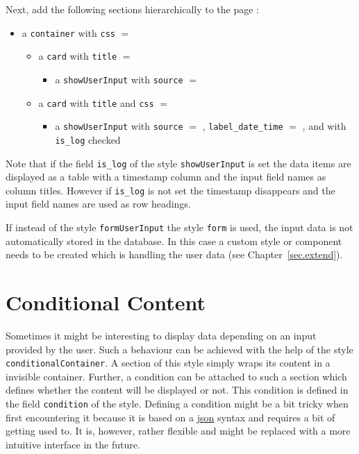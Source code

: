 \documentclass[a4paper,oneside]{book}
\begin{document}
Next, add the following sections hierarchically to the page :
\begin{itemize}
    \item a \texttt{container} with \texttt{css} $=$ 
        \begin{itemize}
            \item a \texttt{card} with \texttt{title} $=$ 
                \begin{itemize}
                    \item a \texttt{showUserInput} with \texttt{source} $=$ 
                \end{itemize}
            \item a \texttt{card} with \texttt{title}  and \texttt{css} $=$ 
                \begin{itemize}
                    \item a \texttt{showUserInput} with \texttt{source} $=$ , \texttt{label\_date\_time} $=$ , and with \texttt{is\_log} checked
                \end{itemize}
        \end{itemize}
\end{itemize}

Note that if the field \texttt{is\_log} of the style \texttt{showUserInput} is set the data items are displayed as a table with a timestamp column and the input field names as column titles.
However if \texttt{is\_log} is not set the timestamp disappears and the input field names are used as row headings.

If instead of the style \texttt{formUserInput} the style \texttt{form} is used, the input data is not automatically stored in the database.
In this case a custom style or component needs to be created which is handling the user data (see Chapter~\ref{sec.extend}).

\section{Conditional Content}
Sometimes it might be interesting to display data depending on an input provided by the user.
Such a behaviour can be achieved with the help of the style \texttt{conditionalContainer}.
A section of this style simply wraps its content in a invisible container.
Further, a condition can be attached to such a section which defines whether the content will be displayed or not.
This condition is defined in the field \texttt{condition} of the style.
Defining a condition might be a bit tricky when first encountering it because it is based on a \href{http://www.json.org/}{json} syntax and requires a bit of getting used to.
It is, however, rather flexible and might be replaced with a more intuitive interface in the future.
\end{document}
